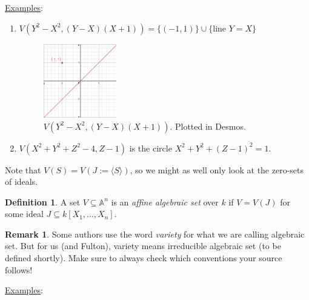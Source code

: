 \documentclass[12pt]{article}
\newcommand{\ita}[1]{\textit{#1}}
\newcommand{\vbrack}[1]{\langle #1\rangle}
\theoremstyle{definition}
\newtheorem{definition}[theorem]{Definition}
\newtheorem*{remark}{Remark}
\begin{document}
\underline{Examples}:
\begin{enumerate}
    \item $V(Y^2-X^2,(Y-X)(X+1))=\{(-1,1)\}\cup\{\text{line }Y=X\}$
    \begin{figure}[H]
        \centering
        \includegraphics[width=0.3\textwidth]{2.png}
        \caption{$V(Y^2-X^2,(Y-X)(X+1))$. Plotted in Desmos.}
    \end{figure}
    \item $V(X^2+Y^2+Z^2-4,Z-1)$ is the circle $X^2+Y^2+(Z-1)^2=1$.
\end{enumerate}
Note that $V(S)=V(J:=\vbrack{S})$, so we might as well only look at the zero-sets of ideals.
\begin{definition}
    A set $V\subseteq\mathbb{A}^n$ is an \ita{affine algebraic set} over $k$ if $V=V(J)$ for some ideal $J\subseteq k[X_1,\dotsc,X_n]$.
\end{definition}
\begin{remark}
    Some authors use the word \ita{variety} for what we are calling algebraic set. But for us (and Fulton), variety means irreducible algebraic set (to be defined shortly). Make sure to always check which conventions your source follows!
\end{remark}
\underline{Examples}: 
\end{document}
